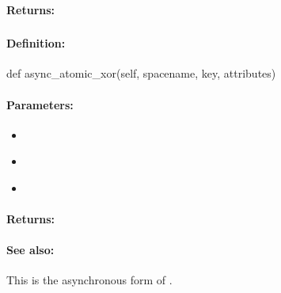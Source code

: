 \paragraph{Returns:}


\pagebreak
\subsubsection{}
\label{api:python:async_atomic_xor}


\paragraph{Definition:}
\begin{pythoncode}
def async_atomic_xor(self, spacename, key, attributes)
\end{pythoncode}

\paragraph{Parameters:}
\begin{itemize}[noitemsep]
\item {}\\

\item {}\\

\item {}\\

\end{itemize}

\paragraph{Returns:}


\paragraph{See also:}  This is the asynchronous form of .

\pagebreak
\subsubsection{}
\label{api:python:cond_atomic_xor}



